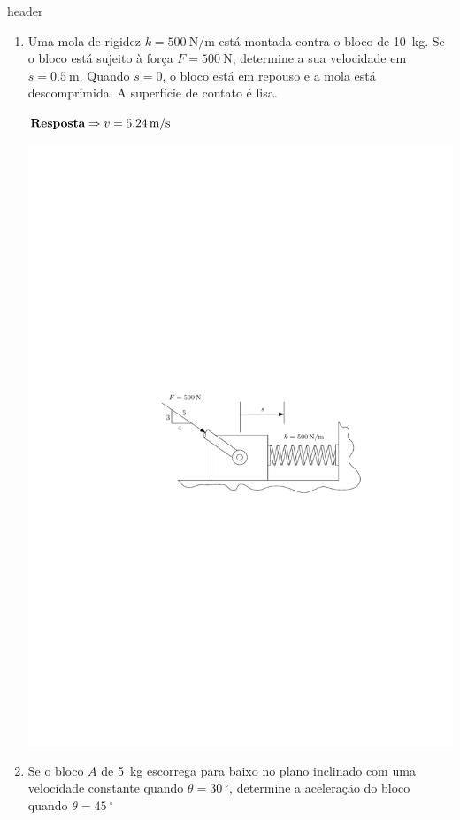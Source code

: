 \documentclass[a4paper,12pt]{article}
\begin{document}
  
	{header}
	
	\begin{enumerate}
		\item Uma mola de rigidez $k=\SI{500}{\newton/\meter}$ está montada contra o bloco de \SI{10}{\kilogram}. Se o bloco está sujeito à força $F=\SI{500}{\newton}$, determine a sua velocidade em $s=\SI{0.5}{\meter}$. Quando $s=0$, o bloco está em repouso e a mola está descomprimida. A superfície de contato é lisa.
		
		$\textbf{\text{Resposta}}\Rightarrow v=\SI{5.24}{\meter/\second}$
		
		\begin{center}
			\includegraphics[scale=1.2]{images/draw_1.pdf}
		\end{center}
		
		\item Se o bloco $A$ de \SI{5}{\kilogram} escorrega para baixo no plano inclinado com uma velocidade constante quando $\theta=\SI{30}{^{\circ}}$, determine a aceleração do bloco quando $\theta=\SI{45}{^{\circ}}$
		

\end{enumerate}
\end{document}

